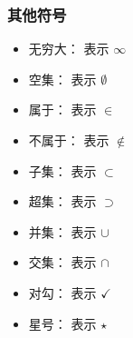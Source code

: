 \documentclass{article}
\begin{document}
\subsubsection{其他符号}
\begin{itemize}
    \item 无穷大：\texttt{\infty} 表示 \(\infty\)
    \item 空集：\texttt{\emptyset} 表示 \(\emptyset\)
    \item 属于：\texttt{\in} 表示 \(\in\)
    \item 不属于：\texttt{\notin} 表示 \(\notin\)
    \item 子集：\texttt{\subset} 表示 \(\subset\)
    \item 超集：\texttt{\supset} 表示 \(\supset\)
    \item 并集：\texttt{\cup} 表示 \(\cup\)
    \item 交集：\texttt{\cap} 表示 \(\cap\)
    \item 对勾：\texttt{\checkmark} 表示 \(\checkmark\)
    \item 星号：\texttt{\star} 表示 \(\star\)
\end{itemize}
\end{document}
